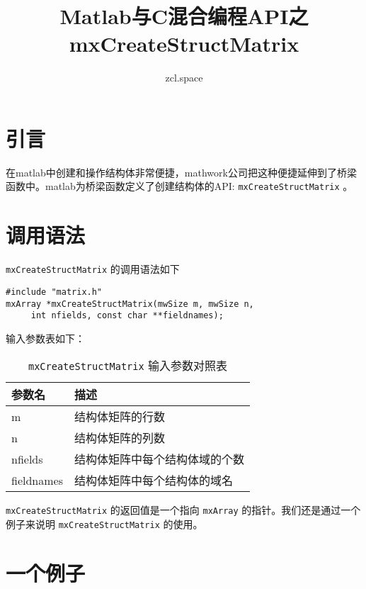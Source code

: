 \documentclass[10pt,a4paper,UTF8]{article}
\author{zcl.space}
\date{}
\title{Matlab与C混合编程API之mxCreateStructMatrix}
\begin{document}
\maketitle
\tableofcontents



\section{引言}
\label{sec:orgheadline1}


在matlab中创建和操作结构体非常便捷，mathwork公司把这种便捷延伸到了桥梁函数中。matlab为桥梁函数定义了创建结构体的API: \texttt{mxCreateStructMatrix} 。
\section{调用语法}
\label{sec:orgheadline2}


\texttt{mxCreateStructMatrix} 的调用语法如下
\lstset{language=C,label= ,caption= ,captionpos=b,numbers=none}
\begin{lstlisting}
#include "matrix.h"
mxArray *mxCreateStructMatrix(mwSize m, mwSize n,
     int nfields, const char **fieldnames);
\end{lstlisting}

输入参数表如下：
\begin{table}[htb]
\caption{\label{tab:orgtable1}
\texttt{mxCreateStructMatrix} 输入参数对照表}
\centering
\begin{tabular}{ll}
\hline
参数名 & 描述\\
\hline
m & 结构体矩阵的行数\\
n & 结构体矩阵的列数\\
nfields & 结构体矩阵中每个结构体域的个数\\
fieldnames & 结构体矩阵中每个结构体的域名\\
\hline
\end{tabular}
\end{table}

\texttt{mxCreateStructMatrix} 的返回值是一个指向 \texttt{mxArray} 的指针。我们还是通过一个例子来说明 \texttt{mxCreateStructMatrix} 的使用。

\section{一个例子}
\label{sec:orgheadline3}
\end{document}
